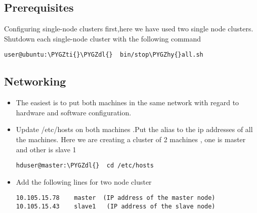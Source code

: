 \documentclass[letterpaper,10pt,english]{sphinxmanual}
\def\PYGZdl{\char`\$}
\def\PYGZhy{\char`\-}
\def\PYGZti{\char`\~}
\begin{document}
\subsection{Prerequisites}
\label{hadoop:id5}
Configuring single-node clusters first,here we have used two single node clusters.
Shutdown each single-node cluster with the following command

\begin{Verbatim}[commandchars=\\\{\}]
user@ubuntu:\PYGZti{}\PYGZdl{}  bin/stop\PYGZhy{}all.sh
\end{Verbatim}


\subsection{Networking}
\label{hadoop:networking}\begin{itemize}
\item {} 
The easiest is to put both machines in the same network with regard to hardware and   software configuration.

\item {} 
Update /etc/hosts on both machines .Put the alias to the ip addresses of all the machines. Here we are creating a cluster of 2 machines , one is master and other is slave 1

\begin{Verbatim}[commandchars=\\\{\}]
hduser@master:\PYGZdl{}  cd /etc/hosts
\end{Verbatim}

\item {} 
Add the following lines for two node cluster

\begin{Verbatim}[commandchars=\\\{\}]
10.105.15.78    master  (IP address of the master node)
10.105.15.43    slave1   (IP address of the slave node)
\end{Verbatim}

\end{itemize}
\end{document}
